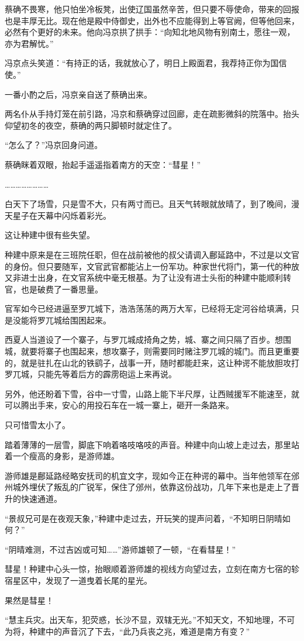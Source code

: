 蔡确不畏寒，他只怕坐冷板凳，出使辽国虽然辛苦，但只要不辱使命，带来的回报也是丰厚无比。现在他是殿中侍御史，出外也不应能得到上等官阙，但等他回来，必然有个更好的未来。他向冯京拱了拱手：“向知北地风物有别南土，愿往一观，亦为君解忧。”

冯京点头笑道：“有持正的话，我就放心了，明日上殿面君，我荐持正你为国信使。”

一番小酌之后，冯京亲自送了蔡确出来。

两名仆从手持灯笼在前引路，冯京和蔡确穿过回廊，走在疏影微斜的院落中。抬头仰望初冬的夜空，蔡确的两只脚顿时就定住了。

“怎么了？”冯京回身问道。

蔡确眯着双眼，抬起手遥遥指着南方的天空：“彗星！”

……………………

白天下了场雪，只是雪不大，只有两寸而已。且天气转眼就放晴了，到了晚间，漫天星子在天幕中闪烁着彩光。

这让种建中很有些失望。

种建中原来是在三班院任职，但在战前被他的叔父请调入鄜延路中，不过是以文官的身份。但只要随军，文官武官都能沾上一份军功。种家世代将门，第一代的种放又非进士出身，在文官系统中毫无根基。为了让没有进士头衔的种建中能顺利转官，也是破费了一番思量。

官军如今已经进逼至罗兀城下，浩浩荡荡的两万大军，已经将无定河谷给填满，只是没能将罗兀城给围困起来。

西夏人当道设了一个寨子，与罗兀城成掎角之势，城、寨之间只隔了百步。想围城，就要将寨子也围起来，想攻寨子，则需要同时赌注罗兀城的城门。而且更重要的，就是驻扎在山北的铁鹞子，战事一开，随时都能赶来，这让种谔不能放胆攻打罗兀城，只能先等着后方的霹雳砲运上来再说。

另外，他还盼着下雪，谷中一寸雪，山路上能下半尺厚，让西贼援军不能速至，就可以腾出手来，安心的用投石车在一城一寨上，砸开一条路来。

只可惜雪太小了。

踏着薄薄的一层雪，脚底下响着咯吱咯吱的声音。种建中向山坡上走过去，那里站着一个瘦高的身影，是游师雄。

游师雄是鄜延路经略安抚司的机宜文字，现如今正在种谔的幕中。当年他领军在邠州城外埋伏了叛乱的广锐军，保住了邠州，依靠这份战功，几年下来也是走上了晋升的快速通道。

“景叔兄可是在夜观天象，”种建中走过去，开玩笑的提声问着，“不知明日阴晴如何？”

“阴晴难测，不过吉凶或可知……”游师雄顿了一顿，“在看彗星！”

彗星！种建中心头一惊，抬眼顺着游师雄的视线方向望过去，立刻在南方七宿的轸宿星区中，发现了一道曳着长尾的星光。

果然是彗星！

“慧主兵灾。出天车，犯荧惑，长沙不显，双辖无光。”不知天文，不知地理，不可为将，种建中的声音沉了下去，“此乃兵丧之兆，难道是南方有变？”

